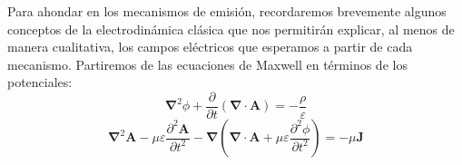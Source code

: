 \documentclass[12 pt, a4paper]{article} %
\numberwithin{equation}{section}
\numberwithin{figure}{section}
\newcommand{\vect}[1]{\boldsymbol{\mathbf{#1}}}
\begin{document}
Para ahondar en los mecanismos de emisión, recordaremos brevemente algunos conceptos de la electrodinámica clásica que nos permitirán explicar, al menos de manera cualitativa, los campos eléctricos que esperamos a partir de cada mecanismo. Partiremos de las ecuaciones de Maxwell en términos de los potenciales:
	\begin{equation}
	\vect{\nabla}^2\phi+\frac{\partial}{\partial t}\left(\vect{\nabla}\cdot\vect{A}\right)=-\frac{\rho}{\varepsilon}\label{ec31}
	\end{equation}
	\begin{equation}
	\vect{\nabla}^2\vect{A}-\mu\varepsilon\frac{\partial^2\vect{A}}{\partial t^2}-\vect{\nabla}\left(\vect{\nabla}\cdot\vect{A}+\mu\varepsilon\frac{\partial^2\phi}{\partial t^2}\right)=-\mu\vect{J}\label{ec32}
	\end{equation}
\end{document}
